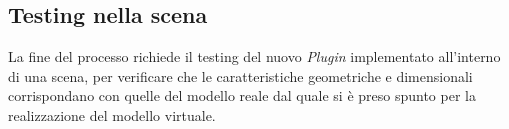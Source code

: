 \subsection{Testing nella scena}
La fine del processo richiede il testing del nuovo \emph{Plugin} implementato all'interno
di una scena, per verificare che le caratteristiche geometriche e dimensionali corrispondano con quelle
del modello reale dal quale si è preso spunto per la realizzazione del modello virtuale.\\
